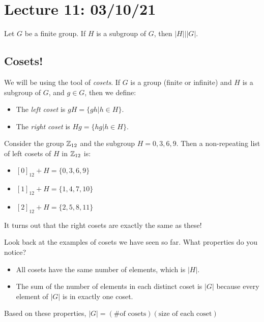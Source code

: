 \section{Lecture 11: 03/10/21}

\begin{theorem}[Lagrange]
Let $G$ be a finite group. If $H$ is a subgroup of $G$, then $|H| \big| |G|$.
\end{theorem}

\subsection{Cosets!}

We will be using the tool of \textit{cosets}. If $G$ is a group (finite or infinite) and $H$ is a subgroup of $G$, and $g \in G$, then we define:

\begin{itemize}
    \item The \textit{left coset} is $gH = \{gh | h \in H\}$.
    \item The \textit{right coset} is $Hg = \{hg | h \in H\}$.
\end{itemize}

\begin{example}[$\Z_{12}$]
Consider the group $\Z_{12}$ and the subgroup $H = {0, 3, 6, 9}$. Then a non-repeating list of left cosets of $H$ in $\Z_{12}$ is:
\begin{itemize}
    \item $[0]_{12} + H = \{0, 3, 6, 9\}$
    \item $[1]_{12} + H = \{1, 4, 7, 10\}$
    \item $[2]_{12} + H = \{2, 5, 8, 11\}$
\end{itemize}

It turns out that the right cosets are exactly the same as these!
\end{example}

\begin{example}
Look back at the examples of cosets we have seen so far. What properties do you notice?
\begin{itemize}
    \item All cosets have the same number of elements, which is $|H|$.
    \item The sum of the number of elements in each distinct coset is $|G|$ because every element of $|G|$ is in exactly one coset.
\end{itemize}
Based on these properties, $|G|=(\mbox{\# of cosets})(\mbox{size of each coset})$
\end{example}

